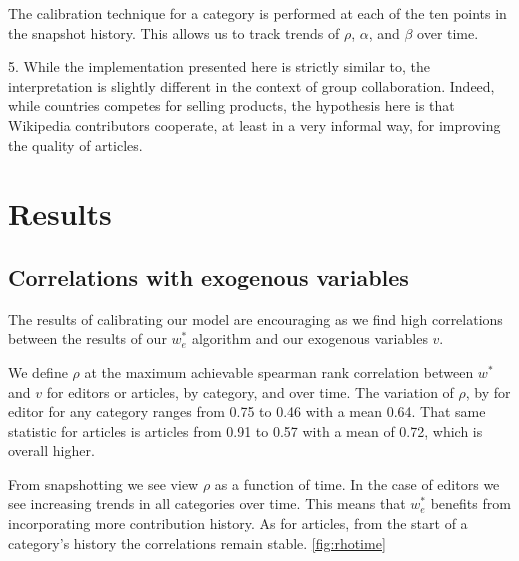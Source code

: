 \documentclass{acm_proc_article-sp}
\begin{document}
The calibration technique for a category is performed at each of the ten points in the snapshot history. This allows us to track trends of $\rho$, $\alpha$, and $\beta$ over time.



5. While the implementation presented here is strictly similar to, the interpretation is slightly different in the context of group collaboration. Indeed, while countries competes for selling products, the hypothesis here is that Wikipedia contributors cooperate, at least in a very informal way, for improving the quality of articles.




\section{Results}


\subsection{Correlations with exogenous variables}

The results of calibrating our model are encouraging as we find high correlations between the results of our $w^*_e$ algorithm and our exogenous variables $v$. 

We define $\rho$ at the maximum achievable spearman rank correlation between $w^*$ and $v$ for editors or articles, by category, and over time. The variation of $\rho$, by for editor for any category ranges from 0.75 to 0.46 with a mean 0.64.  That same statistic for articles is articles from 0.91 to 0.57 with a mean of 0.72, which is overall higher.

 
From snapshotting we see view $\rho$ as  a function of time. In the case of editors we see increasing trends in all categories over time. This means that $w^*_e$ benefits from incorporating more contribution history. As for articles, from the start of a category's history the correlations remain stable. \ref{fig:rhotime}
\end{document}
